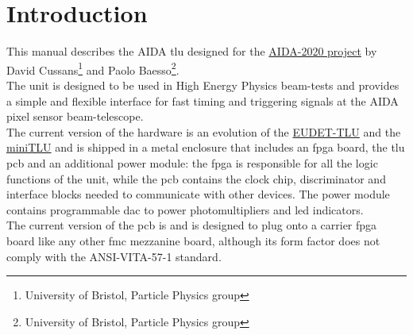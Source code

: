 \chapter{Introduction}\label{ch:introduction}
This manual describes the AIDA \gls{tlu} designed for the \href{http://aida2020.web.cern.ch/}{AIDA-2020 project} by David Cussans\footnote{University of Bristol, Particle Physics group} and Paolo Baesso\footnote{University of Bristol, Particle Physics group}.\\
The unit is designed to be used in High Energy Physics beam-tests and provides a simple and flexible interface for fast timing and triggering signals at the AIDA pixel sensor beam-telescope.\\
The current version of the hardware is an evolution of the \href{https://twiki.cern.ch/twiki/bin/view/MimosaTelescope/TLU}{EUDET-TLU} and the \href{https://www.ohwr.org/projects/fmc-mtlu/wiki}{miniTLU} and is shipped in a metal enclosure that includes an \gls{fpga} board, the \gls{tlu} \gls{pcb} and an additional power module: the \gls{fpga} is responsible for all the logic functions of the unit, while the \gls{pcb} contains the clock chip, discriminator and interface blocks needed to communicate with other devices. The power module contains programmable \gls{dac} to power photomultipliers and \gls{led} indicators.\\
The current version of the \gls{pcb} is \brd and is designed to plug onto a carrier \gls{fpga} board like any other \gls{fmc} mezzanine board, although its form factor does not comply with the ANSI-VITA-57-1 standard.\\


